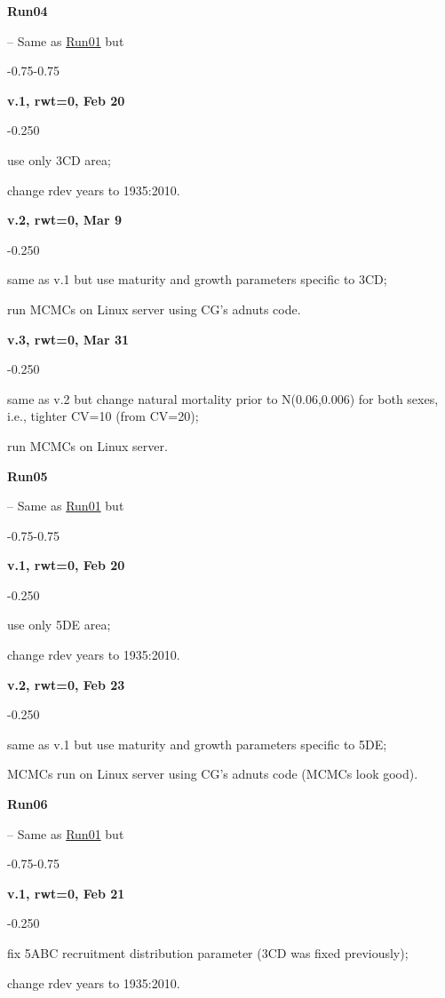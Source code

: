 \hypertarget{R04}{\textbf{Run04}} -- Same as \hyperlink{R01}{Run01} but
\begin{itemize_csas}{-0.75}{-0.75}
	\item \textbf{v.1, rwt=0, Feb 20}
	\begin{itemize_csas}{-0.25}{0}
		\item use only 3CD area;
		\item change rdev years to 1935:2010.
	\end{itemize_csas}
	\item \textbf{v.2, rwt=0, Mar 9}
	\begin{itemize_csas}{-0.25}{0}
		\item same as v.1 but use maturity and growth parameters specific to 3CD;
		\item run MCMCs on Linux server using CG's adnuts code.
	\end{itemize_csas}
	\item \textbf{v.3, rwt=0, Mar 31}
	\begin{itemize_csas}{-0.25}{0}
		\item same as v.2 but change natural mortality prior to N(0.06,0.006) for both sexes, i.e., tighter CV=10\pc{} (from CV=20\pc{});
		\item run MCMCs on Linux server.
	\end{itemize_csas}
\end{itemize_csas}

\hypertarget{R05}{\textbf{Run05}} -- Same as \hyperlink{R01}{Run01} but
\begin{itemize_csas}{-0.75}{-0.75}
	\item \textbf{v.1, rwt=0, Feb 20}
	\begin{itemize_csas}{-0.25}{0}
		\item use only 5DE area;
		\item change rdev years to 1935:2010.
	\end{itemize_csas}
	\item \textbf{v.2, rwt=0, Feb 23}
	\begin{itemize_csas}{-0.25}{0}
		\item same as v.1 but use maturity and growth parameters specific to 5DE;
		\item MCMCs run on Linux server using CG's adnuts code (MCMCs look good).
	\end{itemize_csas}
\end{itemize_csas}

\hypertarget{R06}{\textbf{Run06}} -- Same as \hyperlink{R01}{Run01} but
\begin{itemize_csas}{-0.75}{-0.75}
	\item \textbf{v.1, rwt=0, Feb 21}
	\begin{itemize_csas}{-0.25}{0}
		\item fix 5ABC recruitment distribution parameter (3CD was fixed previously);
		\item change rdev years to 1935:2010.
	\end{itemize_csas}
\end{itemize_csas}

